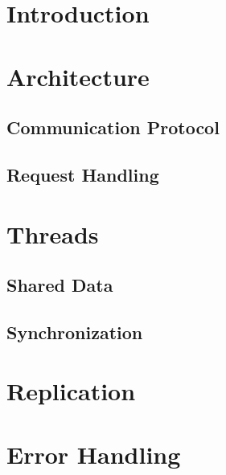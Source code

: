 \documentclass[a4paper, titlepage, english]{article}
\begin{document}
	\section{Introduction}

	\section{Architecture}
	\subsection{Communication Protocol}
	\subsection{Request Handling}

	\section{Threads}
	\subsection{Shared Data}
	\subsection{Synchronization}

	\section{Replication}

	\section{Error Handling}



\end{document}
